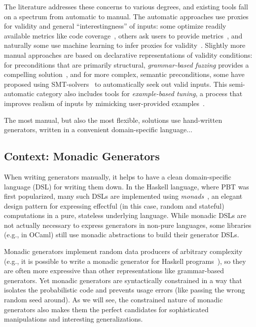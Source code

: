 The literature addresses these concerns to various degrees, and existing tools
fall on a spectrum from automatic to manual. The automatic approaches use
proxies for validity and general ``interestingness'' of inputs: some optimize
readily available metrics like code coverage~\cite{afl-readme}, others ask users
to provide metrics~\cite{loscher2017targetedpbt}, and naturally some use
machine learning to infer proxies for validity~\cite{godefroid2017learn,
DBLP:conf/icse/ReddyLPS20}. Slightly more manual approaches are based on
declarative representations of validity conditions: for preconditions that are
primarily structural, {\em grammar-based fuzzing} provides a compelling
solution~\cite{godefroid2008grammar, holler2012fuzzing, veggalam2016ifuzzer,
wang2019superion, srivastava2021gramatron}, and for more complex, semantic
preconditions, some have proposed using SMT-solvers~\cite{dewey2017automated, LuckPOPL, steinhofel2022input} to
automatically seek out valid inputs. This semi-automatic category also includes
tools for {\em example-based tuning}, a process that improves realism of inputs
by mimicking user-provided examples~\cite{soremekun2020inputs}.

The most manual, but also the most flexible, solutions use hand-written
generators, written in a convenient domain-specific language...

\subsection*{Context: Monadic Generators}
When writing generators manually, it helps to have a clean domain-specific
language (DSL) for writing them down. In the Haskell language, where PBT was
first popularized, many such DSLs are implemented using {\em
monads\/}~\cite{moggi1991notions}, an elegant design pattern for
expressing effectful (in this case, random and stateful) computations
in a pure, stateless underlying
language. While monadic DSLs are not actually necessary to express generators in
non-pure languages, some libraries (e.g., in OCaml) still use monadic
abstractions to build their generator DSLs.

Monadic generators implement random data producers of arbitrary complexity
(e.g., it is possible to write a monadic generator for Haskell
programs~\cite{palka_testing_2011}), so they are often more expressive than
other representations like grammar-based generators.  Yet monadic generators are
syntactically constrained in a way that isolates the probabilistic code and
prevents usage errors (like passing the wrong random seed around). As we will
see, the constrained nature of monadic generators also makes them the perfect
candidates for sophisticated manipulations and interesting generalizations.

